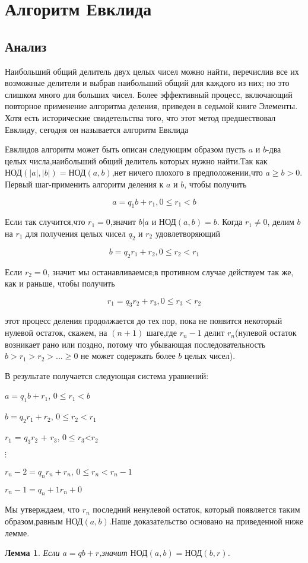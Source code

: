 \documentclass[11pt]{article}
\newtheorem{lemma}{Лемма}
\begin{document}
\section{Алгоритм Евклида}
\subsection{Анализ}
Наибольший общий делитель двух целых чисел можно найти, перечислив все их возможные делители и выбрав наибольший общий для каждого из них; но это слишком много для больших чисел. Более эффективный процесс, включающий повторное применение алгоритма деления, приведен в седьмой книге
Элементы.
Хотя есть исторические свидетельства того, что этот метод предшествовал Евклиду, сегодня он называется
алгоритм Евклида

 Евклидов алгоритм может быть описан следующим образом пусть $a$ и $b$-два целых числа,наибольший общий делитель которых нужно найти.Так как $\text{НОД}(|a|,|b|)=\text{НОД}(a,b)$,нет ничего плохого в предположении,что $a\ge b > 0$.
 Первый шаг-применить алгоритм деления к $a$ и $b$, чтобы получить
 
 	\[a=q_1b+r_1, 0\le r_1<b\]
 
 Если так случится,что $r_1=0$,значит $b|a$ и $\text{НОД}(a,b)=b$. Когда $r_1 \neq 0$,
 делим $b$ на $r_1$ для получения целых чисел $q_2$ и $r_2$ удовлетворяющий
 
 	\[b = q_2r_1 + r_2, 0\le r_2<r_1\]
 
 Если $r_2=0$, значит мы останавливаемся;в противном случае действуем так же, как и раньше, чтобы получить
 
 	\[r_1 = q_3r_2 + r_3, 0\le r_3<r_2\]
 
этот процесс деления продолжается до тех пор, пока не появится некоторый нулевой остаток, скажем, на $(n+1)$ шаге,где $r_n-1$ делит $r_n$(нулевой остаток возникает рано или поздно, потому что убывающая последовательность $b > r_1 > r_2 > ... \ge 0$ не может содержать более $b$ целых чисел).

В результате получается следующая система уравнений:
\begin{center}
	$a=q_1 b+r_1$,	$0\le r_1<b$
	
	$b = q_2r_1 + r_2$, $0\le r_2<r_1$
	
	$r_1$ = $q_3$$r_2$ + $r_3$, $0\le r_3$<$r_2$

    $\vdots$
    
    $r_n-2 = q_nr_n + r_n$, $0\le r_n<r_n-1$
    
    $r_n-1 = q_n+1r_n + 0$
\end{center}
Мы утверждаем, что $r_n$ последний ненулевой остаток, который появляется таким образом,равным $\text{НОД}(a,b)$.Наше доказательство основано на приведенной ниже лемме.
\begin{lemma}
	Если $a=qb+r$,значит $\text{НОД}(a,b)=\text{НОД}(b,r)$.
\end{lemma}
\cite{Burton}


\end{document}

